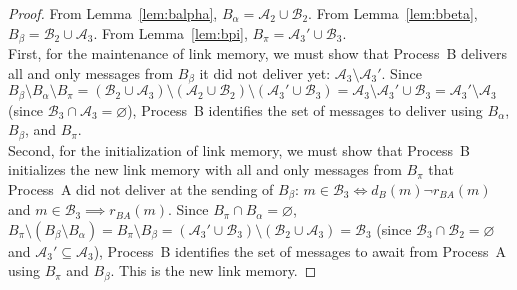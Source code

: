 \begin{proof}
  From Lemma~\ref{lem:balpha}, $B_\alpha = \mathcal{A}_2 \cup \mathcal{B}_2$.
  From Lemma~\ref{lem:bbeta}, $B_\beta= \mathcal{B}_2 \cup \mathcal{A}_3$. From
  Lemma~\ref{lem:bpi}, $B_\pi = \mathcal{A}_3' \cup \mathcal{B}_3$. \\ First,
  for the maintenance of link memory, we must show that Process~B delivers all
  and only messages from $B_\beta$ it did not deliver yet:
  $\mathcal{A}_3 \setminus \mathcal{A}_3'$. Since
  $B_\beta \setminus B_\alpha \setminus B_\pi = (\mathcal{B}_2 \cup
  \mathcal{A}_3) \setminus (\mathcal{A}_2 \cup \mathcal{B}_2) \setminus
  (\mathcal{A}_3' \cup \mathcal{B}_3) = \mathcal{A}_3 \setminus \mathcal{A}_3'
  \cup \mathcal{B}_3 = \mathcal{A}_3'\setminus \mathcal{A}_3$
  (since $\mathcal{B}_3 \cap \mathcal{A}_3 = \varnothing$), Process~B identifies
  the set of messages to deliver using $B_\alpha$, $B_\beta$, and $B_\pi$. \\
  Second, for the initialization of link memory, we must show that Process~B
  initializes the new link memory with all and only messages from $B_\pi$ that
  Process~A did not deliver at the sending of $B_\beta$:
  $m \in \mathcal{B}_3 \Leftrightarrow d_B(m) \neg r_{BA}(m)$ and
  $m \in \mathcal{B}_3 \implies r_{BA}(m)$.  Since
  $B_\pi \cap B_\alpha = \varnothing$,
  $B_\pi \setminus (B_\beta \setminus B_\alpha)= B_\pi \setminus B_\beta =
  (\mathcal{A}_3' \cup \mathcal{B}_3) \setminus (\mathcal{B}_2 \cup
  \mathcal{A}_3) = \mathcal{B}_3$
  (since $\mathcal{B}_3 \cap \mathcal{B}_2 = \varnothing$ and
  $\mathcal{A}_3' \subseteq \mathcal{A}_3$), Process~B identifies the set of
  messages to await from Process~A using $B_\pi$ and $B_\beta$. This is the new
  link memory.
\end{proof}






